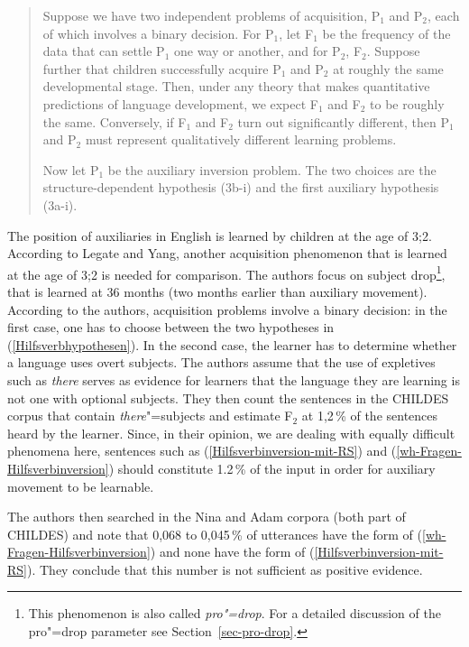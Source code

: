 \begin{quote}
   Suppose we have two independent problems of acquisition, P$_1$ and P$_2$, each
of which involves a binary decision. For P$_1$, let F$_1$ be the frequency of the
data that can settle P$_1$ one way or another, and for P$_2$, F$_2$. Suppose further
that children successfully acquire P$_1$ and P$_2$ at roughly the same developmental
stage. Then, under any theory that makes quantitative predictions of language
development, we expect F$_1$ and F$_2$ to be roughly the same. Conversely, if F$_1$ and
F$_2$ turn out significantly different, then P$_1$ and P$_2$ must represent qualitatively
different learning problems.

   Now let P$_1$ be the auxiliary inversion problem. The two choices are the
structure-dependent hypothesis (3b-i) and the first auxiliary hypothesis (3a-i). \citep[]{LY2002a}
\end{quote}

\noindent
The position of auxiliaries in English is learned by children at the age of 3;2. According to Legate
and Yang, another acquisition phenomenon that is learned at the age of 3;2 is needed for
comparison. The authors focus on subject drop\footnote{
  This phenomenon is also called \emph{pro"=drop}. For a detailed discussion of the pro"=drop
  parameter see Section~\ref{sec-pro-drop}.
}, that is learned
at 36 months (two months earlier than auxiliary movement). According to the authors, acquisition problems involve a binary decision:
in the first case, one has to choose between the two hypotheses in (\ref{Hilfsverbhypothesen}). In the second case, the learner has to determine
whether a language uses overt subjects. The authors assume that the use of expletives such as \emph{there} serves as
evidence for learners that the language they are learning is not one with optional subjects. They then count the sentences in the CHILDES corpus
that contain \emph{there}"=subjects and estimate F$_2$ at 1,2\,\% of the sentences heard by the learner.
Since, in their opinion, we are dealing with equally difficult phenomena here, sentences such as (\ref{Hilfsverbinversion-mit-RS}) and (\ref{wh-Fragen-Hilfsverbinversion})
should constitute 1.2\,\% of the input in order for auxiliary movement to be learnable.

The authors then searched in the Nina and Adam corpora (both part of CHILDES) and note that 0,068 to 0,045\,\% of utterances have the form of
(\ref{wh-Fragen-Hilfsverbinversion}) and none have the form of (\ref{Hilfsverbinversion-mit-RS}). They conclude that this number is not sufficient as positive evidence.

